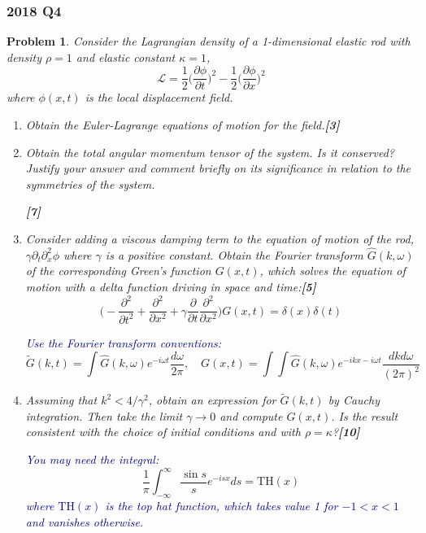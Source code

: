 \documentclass[a4paper]{article}
\theoremstyle{new}
\newtheorem{qns}{Problem}[section]
\begin{document}
\subsubsection*{2018 Q4}
\begin{qns}
Consider the Lagrangian density of a 1-dimensional elastic rod with density $\rho=1$ and elastic constant $\kappa=1$,
$$\mathcal{L}=\frac{1}{2}\bigg(\frac{\partial\phi}{\partial t}\bigg)^2-\frac{1}{2}\bigg(\frac{\partial\phi}{\partial x}\bigg)^2$$
where $\phi(x, t)$ is the local displacement field.
\begin{enumerate}[label=(\alph*)]
\item Obtain the Euler-Lagrange equations of motion for the field.\hfill\textbf{[3]}
\item Obtain the total angular momentum tensor of the system. Is it conserved? Justify your answer and comment briefly on its significance in relation to the symmetries of the system.

\hfill\textbf{[7]}
\item Consider adding a viscous damping term to the equation of motion of the rod, $\gamma\partial_t\partial_x^2\phi$ where $\gamma$ is a positive constant. Obtain the Fourier transform $\hat{G}(k,\omega)$ of the corresponding Green’s function $G(x, t)$, which solves the equation of motion with a delta function driving in space and time:\hfill\textbf{[5]}
$$\bigg(-\frac{\partial^2}{\partial t^2}+\frac{\partial^2}{\partial x^2}+\gamma\frac{\partial}{\partial t}\frac{\partial^2}{\partial x^2}\bigg)G(x,t)=\delta(x)\delta(t)$$
\begin{mdframed}
\textcolor{darkblue}{Use the Fourier transform conventions:}
$$\tilde{G}(k,t)=\int\hat{G}(k,\omega)e^{-i\omega t}\frac{d\omega}{2\pi},\quad G(x,t)=\int\int\hat{G}(k,\omega)e^{-ikx-i\omega t}\frac{dkd\omega}{(2\pi)^2}$$
\end{mdframed}
\item Assuming that $k^2<4/\gamma^2$, obtain an expression for $\tilde{G}(k,t)$ by Cauchy integration. Then take the limit $\gamma\rightarrow 0$ and compute $G(x, t)$. Is the result consistent with the choice of initial conditions and with $\rho=\kappa$?\hfill\textbf{[10]}

\begin{mdframed}
\textcolor{darkblue}{You may need the integral:}
$$\frac{1}{\pi}\int_{-\infty}^\infty\frac{\sin s}{s}e^{-isx}ds=\text{TH}(x)$$
\textcolor{darkblue}{where $\text{TH}(x)$ is the top hat function, which takes value 1 for $-1<x<1$ and vanishes otherwise.}
\end{mdframed}
\end{enumerate}
\end{qns}
\end{document}
